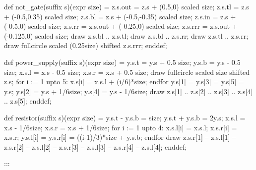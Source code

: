 def not_gate(suffix s)(expr size) =
 z.s.out = z.s + (0.5,0) scaled size;
 z.s.tl = z.s + (-0.5,0.35) scaled size;
 z.s.bl = z.s + (-0.5,-0.35) scaled size;
 z.s.in = z.s + (-0.5,0) scaled size;
 z.s.rr = z.s.out + (-0.25,0) scaled size;
 z.s.rrr = z.s.out + (-0.125,0) scaled size;
 draw z.s.bl .. z.s.tl;
 draw z.s.bl .. z.s.rr;
 draw z.s.tl .. z.s.rr;
 draw fullcircle scaled (0.25size) shifted z.s.rrr;
enddef;

def power_supply(suffix s)(expr size) =
 y.s.t = y.s + 0.5 size; y.s.b = y.s - 0.5 size;
 x.s.l = x.s - 0.5 size; x.s.r = x.s + 0.5 size;
 draw fullcircle scaled size shifted z.s;
 for i := 1 upto 5: x.s[i] = x.s.l + (i/6)*size; endfor
 y.s[1] = y.s[3] = y.s[5] = y.s;
 y.s[2] = y.s + 1/6size; y.s[4] = y.s - 1/6size;
 draw z.s[1] .. z.s[2] .. z.s[3] .. z.s[4] .. z.s[5];
enddef;

def resistor(suffix s)(expr size) =
 y.s.t - y.s.b = size; y.s.t + y.s.b = 2y.s;
 x.s.l = x.s - 1/6size; x.s.r = x.s + 1/6size;
 for i := 1 upto 4:
  x.s.l[i] = x.s.l; x.s.r[i] = x.s.r;
  y.s.l[i] = y.s.r[i] = ((i-1)/3)*size + y.s.b;
 endfor
 draw z.s.r[1] -- z.s.l[1] -- z.s.r[2] -- z.s.l[2] --
           z.s.r[3] -- z.s.l[3] -- z.s.r[4] -- z.s.l[4];
enddef;

:::

\def\MTbeginfigure(#1,#2);{\MTbeginchar(#1pt,#2pt,0pt);}

\def\MTendfigure"#1"#2;{\MTendchar; %
 $$\predisplaypenalty=50 \displaywidth=\hsize \displayindent=0pt
 {\def\cr{\string\cr\space}\def\cite{\string\cite}\def|{\string\aut\space}%
  \def\person{\string\person}\def\Syntax{\string\Syntax}%
  \dest\toc9{#1\string|#2}}\global\advance\d@stno1
 \vcenter{\hbox{\box\MTbox}}\qquad
 \vcenter{\hbox{\goto{\vbox{\bf\halign{\hfil##\hfil\cr#1\crcr}}%
  }{\number\d@stno}}}$$}

\def\MTendfigureX"#1"#2;{\MTendchar; %
 $$\predisplaypenalty=50 \displaywidth=\hsize \displayindent=0pt
 {\def\cr{\string\cr\space}\def\cite{\string\cite}\def|{\string\aut\space}%
  \def\person{\string\person}\def\Syntax{\string\Syntax}%
  \dest\toc9{#1\string|#2}}\global\advance\d@stno1
 \vcenter{\hbox{\box\MTbox}}\hss %
 \vcenter{\hbox{\goto{\vbox{\bf\halign{\hfil##\hfil\cr#1\crcr}}%
  }{\number\d@stno}}}$$}


\def\uncatcodeall{\def\do##1{\catcode`##1=12 }\dospecials\dohigh}
\def\iverb#1{\begingroup\uncatcodeall\obeyspaces\obeylines\d@iverb#1}
\def\d@iverb#1#2{\def\next##1#2{\immediate\write#1{##1}\endgroup}\next}
\def\wverb#1{\begingroup\uncatcodeall\obeyspaces\obeylines\d@wverb#1}
\def\d@wverb#1#2{\def\next##1#2{\write#1{##1}\endgroup}\next}

